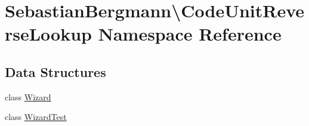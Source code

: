 \hypertarget{namespace_sebastian_bergmann_1_1_code_unit_reverse_lookup}{}\section{Sebastian\+Bergmann\textbackslash{}Code\+Unit\+Reverse\+Lookup Namespace Reference}
\label{namespace_sebastian_bergmann_1_1_code_unit_reverse_lookup}
\subsection*{Data Structures}
\begin{DoxyCompactItemize}
\item 
class \mbox{\hyperlink{class_sebastian_bergmann_1_1_code_unit_reverse_lookup_1_1_wizard}{Wizard}}
\item 
class \mbox{\hyperlink{class_sebastian_bergmann_1_1_code_unit_reverse_lookup_1_1_wizard_test}{Wizard\+Test}}
\end{DoxyCompactItemize}
